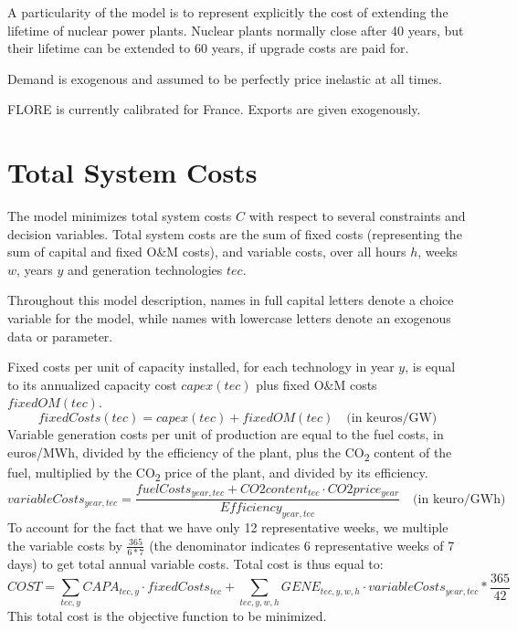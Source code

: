 \documentclass[authoryear]{elsarticle}
\begin{document}
A particularity of the model is to represent explicitly the cost of extending the lifetime of nuclear power plants. Nuclear plants normally close after 40 years, but their lifetime can be extended to 60 years, if upgrade costs are paid for.

Demand is exogenous and assumed to be perfectly price inelastic at all times.

FLORE is currently calibrated for France. Exports are given exogenously.

\section{Total System Costs}

The model minimizes total system costs $C$ with respect to several constraints and decision variables. Total system costs are the sum of fixed costs (representing the sum of capital and fixed O\&M costs), and variable costs, over all hours $h$, weeks $w$, years $y$ and generation technologies $tec$. 

Throughout this model description, names in full capital letters denote a choice variable for the model, while names with lowercase letters denote an exogenous data or parameter.

Fixed costs per unit of capacity installed, for each technology in year $y$, is equal to its annualized capacity cost $capex(tec)$ plus fixed O\&M costs $fixedOM(tec)$. 
\begin{equation*}
fixedCosts(tec) = capex(tec) + 	fixedOM(tec) \quad \text{(in keuros/GW)}
\end{equation*}
Variable generation costs per unit of production are equal to the fuel costs, in euros/MWh, divided by the efficiency of the plant, plus the CO\textsubscript{2} content of the fuel, multiplied by the CO\textsubscript{2} price of the plant, and divided by its efficiency.
\begin{equation*}
variableCosts_{year,tec} = \frac{ fuelCosts_{year,tec} + CO2content_{tec} \cdot CO2price_{year} } {Efficiency_{year, tec}} \quad \text{(in keuro/GWh)}
\end{equation*}
To account for the fact that we have only 12 representative weeks, we multiple the variable costs by $\frac{365}{6*7}$ (the denominator indicates 6 representative weeks of 7 days) to get total annual variable costs. Total cost is thus equal to:
\begin{equation}
COST =\sum_{tec,y} CAPA_{tec,y} \cdot fixedCosts_{tec} + \sum_{tec,y,w,h} GENE_{tec,y,w,h} \cdot variableCosts_{year,tec} * \frac{365}{42}
\end{equation}
This total cost is the objective function to be minimized.
\end{document}
